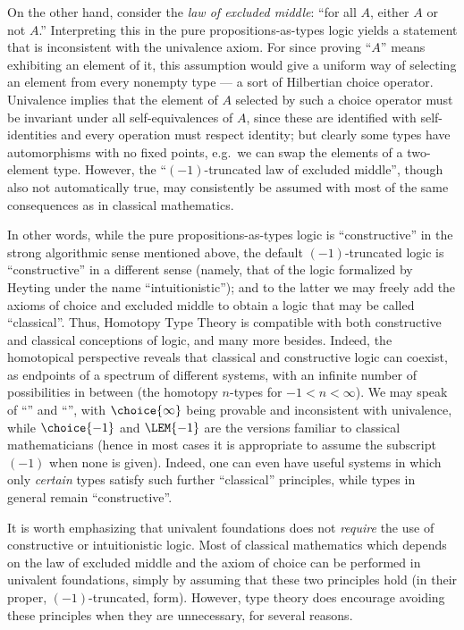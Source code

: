 %
%
On the other hand, consider the \emph{law of excluded middle}: ``for all $A$, either $A$ or not $A$.''
Interpreting this in the pure propositions-as-types logic yields a statement that is inconsistent with the univalence axiom.
For since proving ``$A$'' means exhibiting an element of it, this assumption would give a uniform way of selecting an element from every nonempty type --- a sort of Hilbertian choice operator.
Univalence implies that the element of $A$ selected by such a choice operator must be invariant under all self-equivalences of $A$, since these are identified with self-identities and every operation must respect identity; but clearly some types have automorphisms with no fixed points, e.g.\ we can swap the elements of a two-element type.
%
However, the ``$(-1)$-truncated law of excluded middle'', though also not automatically true, may consistently be assumed with most of the same consequences as in classical mathematics.

In other words, while the pure propositions-as-types logic is ``constructive'' in the strong algorithmic sense mentioned above, the default $(-1)$-truncated logic is ``constructive'' in a different sense (namely, that of the logic formalized by Heyting under the name ``intuitionistic''); and to the latter we may freely add the axioms of choice and excluded middle to obtain a logic that may be called ``classical''.
Thus, Homotopy Type Theory is compatible with both constructive and classical conceptions of logic, and many more besides.
%
Indeed, the homotopical perspective reveals that classical and constructive logic can coexist, as endpoints of a spectrum of different systems, with an infinite number of possibilities in between (the homotopy $n$-types for $-1 < n < \infty$).
We may speak of ``'' and ``'', with $\choice{\infty}$ being provable and \LEM{\infty} inconsistent with univalence, while $\choice{-1}$ and $\LEM{-1}$ are the versions familiar to classical mathematicians (hence in most cases it is appropriate to assume the subscript $(-1)$ when none is given).  Indeed, one can even have useful systems in which only \emph{certain} types satisfy such further ``classical'' principles, while types in general remain ``constructive''.%

It is worth emphasizing that univalent foundations does not \emph{require} the use of constructive or intuitionistic logic. %
Most of classical mathematics which depends on the law of excluded middle and the axiom of choice can be performed in univalent foundations, simply by assuming that these two principles hold (in their proper, $(-1)$-truncated, form).
However, type theory does encourage avoiding these principles when they are unnecessary, for several reasons.

